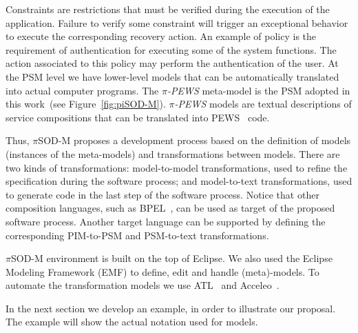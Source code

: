 Constraints are restrictions that must be verified during the execution of the application. 
Failure to verify some constraint will trigger an exceptional behavior to execute the corresponding recovery action.
An example of policy is the requirement of authentication for executing some of the system functions. 
The action associated to this policy may perform the authentication of the user.
%
At the PSM level we have lower-level models that can be automatically translated into actual computer programs.
The \textit{$\pi$-PEWS} meta-model is the PSM adopted in this work~(see Figure~\ref{fig:piSOD-M}).
\textit{$\pi$-PEWS} models are textual descriptions of service compositions that can be translated into PEWS~\cite{BHM06} %
code.





%
Thus, $\pi$SOD-M proposes a development process based on the definition of models
(instances of the meta-models) and transformations between models.
There are two kinds of transformations:
model-to-model transformations, used to refine the specification during the software process; and
model-to-text transformations, used   to generate code in the last step of the software process.
Notice that other composition languages, such as BPEL~\cite{bpel03}, can be used as target of the proposed software process. Another target language can be supported by defining the corresponding PIM-to-PSM and PSM-to-text transformations.



$\pi$SOD-M environment is built on the top of Eclipse. 
We also used the Eclipse Modeling Framework (EMF) to define, edit and handle
(meta)-models. 
To automate the transformation models we use ATL~\cite{atl_manual} and Acceleo~\cite{acceleo}.

In the next section we develop an example, in order to illustrate our proposal.
The example will show the actual notation used for models. 





